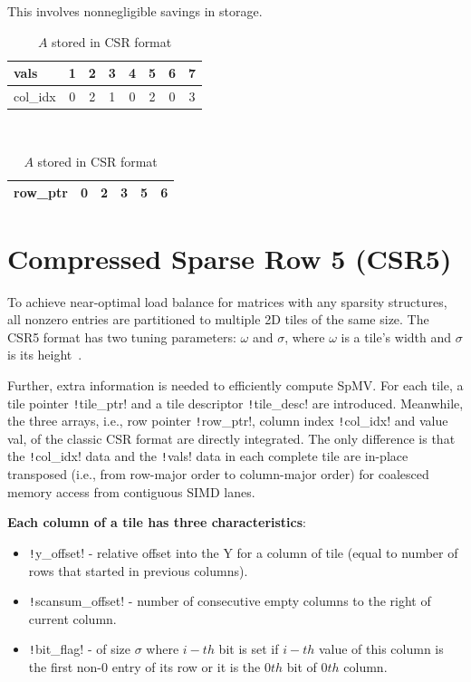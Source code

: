 \documentclass[thesis=M,english]{FITthesis}[2019/12/23]
\begin{document}
This involves nonnegligible savings in storage.

\begin{table}[h!]
    \centering
    \begin{tabular}{ |l||c|c|c|c|c|c|c| }
        \hline
        vals     & 1 & 2 & 3 & 4 & 5 & 6 & 7 \\
        \hline
        col\_idx & 0 & 2 & 1 & 0 & 2 & 0 & 3 \\
        \hline
    \end{tabular} \\
    \begin{tabular}{ |l||c|c|c|c|c| }
        \hline
        row\_ptr & 0 & 2 & 3 & 5 & 6 \\
        \hline
    \end{tabular}
    \caption{$A$ stored in CSR format}
\end{table}

\section{Compressed Sparse Row 5 (CSR5)}\label{csr5Intro}
\newcommand{\csre}[1]{\texttt!#1!}

To achieve near-optimal load balance for matrices with any sparsity structures,
all nonzero entries are partitioned to multiple 2D tiles of the same size.
The CSR5 format has two tuning parameters: \(\omega{}\) and \(\sigma{}\), where \(\omega{}\)
is a tile’s width and \(\sigma{}\) is its height~\cite{liu2015csr5}.

Further, extra information is needed to efficiently compute SpMV\@.
For each tile, a tile pointer \csre{tile_ptr} and a tile descriptor \csre{tile_desc} are introduced.
Meanwhile, the three arrays, i.e., row pointer \csre{row_ptr}, column index \csre{col_idx} and value val,
of the classic CSR format are directly integrated. The only difference is that the \csre{col_idx} data and the \csre{vals}
data in each complete tile are in-place transposed (i.e., from row-major order to column-major order) for coalesced memory access from contiguous SIMD lanes.


\textbf{Each column of a tile has three characteristics}:
\begin{itemize}
    \item \csre{y_offset} - relative offset into the Y for a column of tile (equal to number of rows that started in previous columns).
    \item \csre{scansum_offset} - number of consecutive empty columns to the right of current column.
    \item \csre{bit_flag} - of size $\sigma$ where $i-th$ bit is set if $i-th$ value of this column is the first non-0 entry of its row
          or it is the $0th$ bit of $0th$ column.
\end{itemize}
\end{document}
